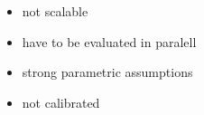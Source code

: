 \documentclass[preview]{standalone}
\begin{document}
\begin{center}
{\selectfont \begin{itemize} \begin{itemize}
        \item not scalable 
        \item have to be evaluated in paralell 
        \item strong parametric assumptions
        \item not calibrated 
        \end{itemize} \end{itemize}}
\end{center}
\end{document}
